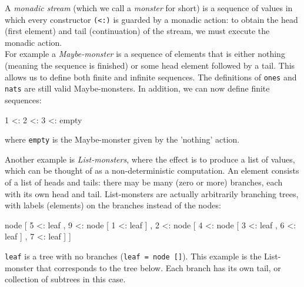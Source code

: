 A \emph{monadic stream} (which we call a \emph{monster} for short) is a sequence of values in which every constructor \verb+(<:)+ is guarded by a monadic action: to obtain the head (first element) and tail (continuation) of the stream, we must execute the monadic action. \\

For example a \emph{Maybe-monster} is a sequence of elements that is either nothing (meaning the sequence is finished) or some head element followed by a tail. This allows us to define both finite and infinite sequences. The definitions of \verb+ones+ and \verb+nats+ are still valid Maybe-monsters. In addition, we can now define finite sequences:
\begin{haskell}
  1 <: 2 <: 3 <: empty
\end{haskell}
where \verb+empty+ is the Maybe-monster given by the 'nothing' action. 

Another example is \emph{List-monsters}, where the effect is to produce a list of values, which can be thought of as a non-deterministic computation. An element consists of a list of heads and tails: there may be many (zero or more) branches, each with its own head and tail.
List-monsters are actually arbitrarily branching trees, with labels (elements) on the branches instead of the nodes:
\begin{haskell}
node [ 5 <: leaf
     , 9 <: node [ 1 <: leaf
                 ]
     , 2 <: node [ 4 <: node [ 3 <: leaf
                             , 6 <: leaf
                             ]
                 , 7 <: leaf
                 ]
     ]
\end{haskell}
\verb+leaf+ is a tree with no branches (\verb+leaf = node []+). This example is the List-monster that corresponds to the tree below. Each branch has its own tail, or collection of subtrees in this case. \\

 \\

